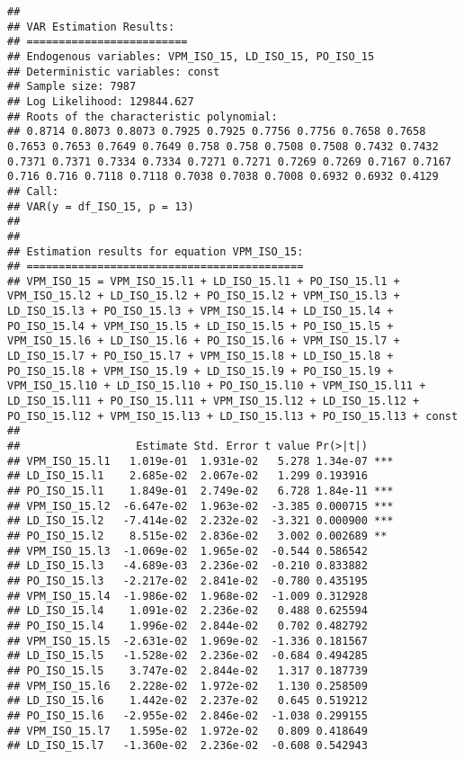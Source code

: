 \documentclass[
]{article}
\begin{document}
\begin{verbatim}
## 
## VAR Estimation Results:
## ========================= 
## Endogenous variables: VPM_ISO_15, LD_ISO_15, PO_ISO_15 
## Deterministic variables: const 
## Sample size: 7987 
## Log Likelihood: 129844.627 
## Roots of the characteristic polynomial:
## 0.8714 0.8073 0.8073 0.7925 0.7925 0.7756 0.7756 0.7658 0.7658 0.7653 0.7653 0.7649 0.7649 0.758 0.758 0.7508 0.7508 0.7432 0.7432 0.7371 0.7371 0.7334 0.7334 0.7271 0.7271 0.7269 0.7269 0.7167 0.7167 0.716 0.716 0.7118 0.7118 0.7038 0.7038 0.7008 0.6932 0.6932 0.4129
## Call:
## VAR(y = df_ISO_15, p = 13)
## 
## 
## Estimation results for equation VPM_ISO_15: 
## =========================================== 
## VPM_ISO_15 = VPM_ISO_15.l1 + LD_ISO_15.l1 + PO_ISO_15.l1 + VPM_ISO_15.l2 + LD_ISO_15.l2 + PO_ISO_15.l2 + VPM_ISO_15.l3 + LD_ISO_15.l3 + PO_ISO_15.l3 + VPM_ISO_15.l4 + LD_ISO_15.l4 + PO_ISO_15.l4 + VPM_ISO_15.l5 + LD_ISO_15.l5 + PO_ISO_15.l5 + VPM_ISO_15.l6 + LD_ISO_15.l6 + PO_ISO_15.l6 + VPM_ISO_15.l7 + LD_ISO_15.l7 + PO_ISO_15.l7 + VPM_ISO_15.l8 + LD_ISO_15.l8 + PO_ISO_15.l8 + VPM_ISO_15.l9 + LD_ISO_15.l9 + PO_ISO_15.l9 + VPM_ISO_15.l10 + LD_ISO_15.l10 + PO_ISO_15.l10 + VPM_ISO_15.l11 + LD_ISO_15.l11 + PO_ISO_15.l11 + VPM_ISO_15.l12 + LD_ISO_15.l12 + PO_ISO_15.l12 + VPM_ISO_15.l13 + LD_ISO_15.l13 + PO_ISO_15.l13 + const 
## 
##                  Estimate Std. Error t value Pr(>|t|)    
## VPM_ISO_15.l1   1.019e-01  1.931e-02   5.278 1.34e-07 ***
## LD_ISO_15.l1    2.685e-02  2.067e-02   1.299 0.193916    
## PO_ISO_15.l1    1.849e-01  2.749e-02   6.728 1.84e-11 ***
## VPM_ISO_15.l2  -6.647e-02  1.963e-02  -3.385 0.000715 ***
## LD_ISO_15.l2   -7.414e-02  2.232e-02  -3.321 0.000900 ***
## PO_ISO_15.l2    8.515e-02  2.836e-02   3.002 0.002689 ** 
## VPM_ISO_15.l3  -1.069e-02  1.965e-02  -0.544 0.586542    
## LD_ISO_15.l3   -4.689e-03  2.236e-02  -0.210 0.833882    
## PO_ISO_15.l3   -2.217e-02  2.841e-02  -0.780 0.435195    
## VPM_ISO_15.l4  -1.986e-02  1.968e-02  -1.009 0.312928    
## LD_ISO_15.l4    1.091e-02  2.236e-02   0.488 0.625594    
## PO_ISO_15.l4    1.996e-02  2.844e-02   0.702 0.482792    
## VPM_ISO_15.l5  -2.631e-02  1.969e-02  -1.336 0.181567    
## LD_ISO_15.l5   -1.528e-02  2.236e-02  -0.684 0.494285    
## PO_ISO_15.l5    3.747e-02  2.844e-02   1.317 0.187739    
## VPM_ISO_15.l6   2.228e-02  1.972e-02   1.130 0.258509    
## LD_ISO_15.l6    1.442e-02  2.237e-02   0.645 0.519212    
## PO_ISO_15.l6   -2.955e-02  2.846e-02  -1.038 0.299155    
## VPM_ISO_15.l7   1.595e-02  1.972e-02   0.809 0.418649    
## LD_ISO_15.l7   -1.360e-02  2.236e-02  -0.608 0.542943    

\end{verbatim}
\end{document}

